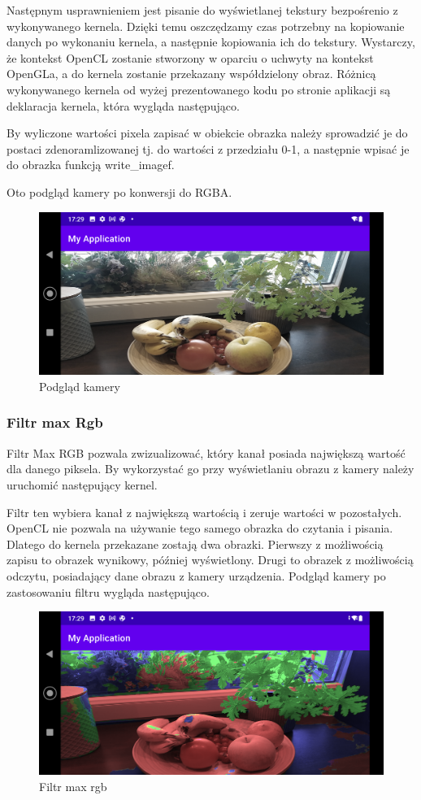 Następnym usprawnieniem jest pisanie do wyświetlanej tekstury bezpośrenio z wykonywanego kernela. Dzięki temu oszczędzamy czas potrzebny na kopiowanie danych po wykonaniu kernela, a następnie kopiowania ich do tekstury. Wystarczy, że kontekst OpenCL zostanie stworzony w oparciu o uchwyty na kontekst OpenGLa, a do kernela zostanie przekazany współdzielony obraz. Różnicą wykonywanego kernela od wyżej prezentowanego kodu po stronie aplikacji są deklaracja kernela, która wygląda następująco.

By wyliczone wartości pixela zapisać w obiekcie obrazka należy sprowadzić je do postaci zdenoramlizowanej tj. do wartości z przedziału 0-1, a następnie wpisać je do obrazka funkcją write\_imagef.

Oto podgląd kamery po konwersji do RGBA.
\begin{figure}[H]
	\includegraphics[scale=0.16]{imgs/preview.png}
	\caption{Podgląd kamery}
\end{figure}
\subsubsection[Filtr max Rgb]{Filtr max Rgb}
Filtr Max RGB pozwala zwizualizować, który kanał posiada największą wartość dla danego piksela. By wykorzystać go przy wyświetlaniu obrazu z kamery należy uruchomić następujący kernel.

Filtr ten wybiera kanał z największą wartością i zeruje wartości w pozostałych. OpenCL nie pozwala na używanie tego samego obrazka do czytania i pisania. Dlatego do kernela przekazane zostają dwa obrazki. Pierwszy z możliwością zapisu to obrazek wynikowy, później wyświetlony. Drugi to obrazek z możliwością odczytu, posiadający dane obrazu z kamery urządzenia. Podgląd kamery po zastosowaniu filtru wygląda następująco.
\begin{figure}[H]
	\includegraphics[scale=0.16]{imgs/maxRgb.png}
	\caption{Filtr max rgb}
\end{figure}

